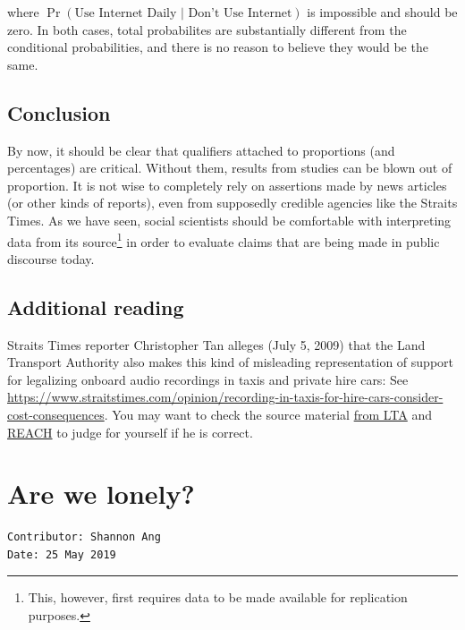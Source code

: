 \documentclass[openany]{book}
\let\rmarkdownfootnote\footnote%
\def\footnote{\protect\rmarkdownfootnote}
\begin{document}
where \(\Pr(\text{Use Internet Daily } | \text{ Don't Use Internet})\)
is impossible and should be zero. In both cases, total probabilites are
substantially different from the conditional probabilities, and there is
no reason to believe they would be the same.

\section{Conclusion}\label{conclusion}

By now, it should be clear that qualifiers attached to proportions (and
percentages) are critical. Without them, results from studies can be
blown out of proportion. It is not wise to completely rely on assertions
made by news articles (or other kinds of reports), even from supposedly
credible agencies like the Straits Times. As we have seen, social
scientists should be comfortable with interpreting data from its
source\footnote{This, however, first requires data to be made available
  for replication purposes.} in order to evaluate claims that are being
made in public discourse today.

\section{Additional reading}\label{additional-reading}

Straits Times reporter Christopher Tan alleges (July 5, 2009) that the
Land Transport Authority also makes this kind of misleading
representation of support for legalizing onboard audio recordings in
taxis and private hire cars: See
\url{https://www.straitstimes.com/opinion/recording-in-taxis-for-hire-cars-consider-cost-consequences}.
You may want to check the source material
\href{https://www.lta.gov.sg/apps/news/page.aspx?c=2\&id=6157ec3f-4e45-4dcc-9c78-7d8506084576\#2}{from
LTA} and
\href{https://www.reach.gov.sg/~/media/2019/press-release/invehicle-recording-devices-poll-media-release.pdf}{REACH}
to judge for yourself if he is correct.

\chapter{Are we lonely?}\label{lonely}

\begin{verbatim}
Contributor: Shannon Ang
Date: 25 May 2019
\end{verbatim}
\end{document}
